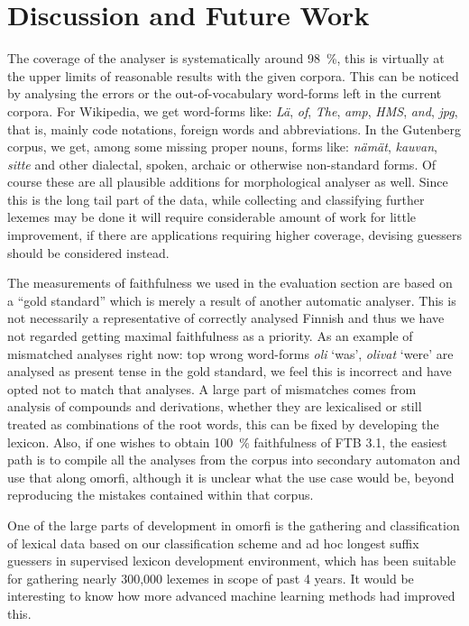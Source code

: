 \documentclass[a4paper,12pt]{article}
\begin{document}
\section{Discussion and Future Work}
\label{sec:discussion}

The coverage of the analyser is systematically around 98~\%, this is virtually
at the upper limits of reasonable results with the given corpora. This can be
noticed by analysing the errors or the out-of-vocabulary word-forms left in the
current corpora. For Wikipedia, we get word-forms like: \emph{Lä}, \emph{of},
\emph{The}, \emph{amp}, \emph{HMS}, \emph{and}, \emph{jpg}, that is, mainly
code notations, foreign words and abbreviations. In the Gutenberg corpus, we
get, among some missing proper nouns, forms like: \emph{nämät}, \emph{kauvan},
\emph{sitte} and other dialectal, spoken, archaic or otherwise non-standard
forms. Of course these are all plausible additions for morphological analyser
as well. Since this is the long tail part of the data, while
collecting and classifying further lexemes may be done it will require
considerable amount of work for little improvement, if there are applications
requiring higher coverage, devising guessers should be  considered instead.

The measurements of faithfulness we used in the evaluation section are based on
a ``gold standard'' which is merely a result of another automatic analyser.
This is not necessarily a representative of correctly analysed Finnish and thus
we have not regarded getting maximal faithfulness as a priority. As an example
of mismatched analyses right now: top wrong word-forms \emph{oli} `was',
\emph{olivat} `were' are analysed as present tense in the gold standard, we
feel this is incorrect and have opted not to match that analyses. A large part
of mismatches comes from analysis of compounds and derivations, whether they
are lexicalised or still treated as combinations of the root words, this can be
fixed by developing the lexicon.  Also, if one wishes to obtain 100~\%
faithfulness of FTB 3.1, the easiest path is to compile all the analyses from
the corpus into secondary automaton and use that along omorfi, although it is
unclear what the use case would be, beyond reproducing the mistakes contained
within that corpus.

One of the large parts of development in omorfi is the gathering and
classification of lexical data based on our classification scheme and ad hoc
longest suffix guessers in supervised lexicon development environment, which
has been suitable for gathering nearly 300,000 lexemes in scope of
past 4 years. It would be interesting to know how more advanced machine learning
methods had improved this.
\end{document}

